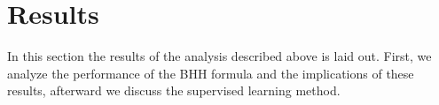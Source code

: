 \section{Results}
In this section the results of the analysis described above is laid out.
First, we analyze the performance of the BHH formula and the implications of these results, afterward we discuss the supervised learning method.




